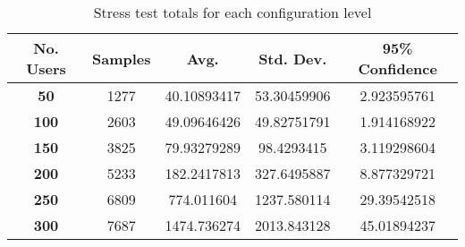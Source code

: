 	\begin{table}[H]
	\centering
	\begin{tabular}{|c|c|c|c|c|}
		\hline 
		\textbf{No. Users} & \textbf{Samples} & \textbf{Avg.} & \textbf{Std. Dev.} & \textbf{95\% Confidence}\tabularnewline
		\hline 
		\hline 
		\textbf{50} & 1277 & 40.10893417 & 53.30459906 & 2.923595761\tabularnewline
		\hline 
		\textbf{100} & 2603 & 49.09646426 & 49.82751791 & 1.914168922\tabularnewline
		\hline 
		\textbf{150} & 3825 & 79.93279289 & 98.4293415 & 3.119298604\tabularnewline
		\hline 
		\textbf{200} & 5233 & 182.2417813 & 327.6495887 & 8.877329721\tabularnewline
		\hline 
		\textbf{250} & 6809 & 774.011604 & 1237.580114 & 29.39542518\tabularnewline
		\hline 
		\textbf{300} & 7687 & 1474.736274 & 2013.843128 & 45.01894237\tabularnewline
		\hline 
	\end{tabular}
	\caption{Stress test totals for each configuration level}\label{tab:eval:ci}
	\end{table}